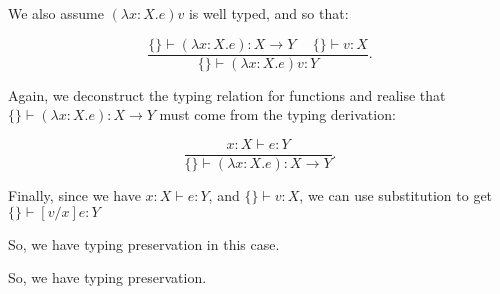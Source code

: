 \begin{enumerate}
\begin{itemize}
          We also assume $(\lambda x : X . e) v$ is well typed, and so that:

          \[
            \frac{\{\} \vdash (\lambda x : X . e) :X \rightarrow Y \hspace{15pt} \{\} \vdash v : X}{\{\} \vdash (\lambda x : X . e) v : Y}
          .\] 

          Again, we deconstruct the typing relation for functions and realise that $\{\} \vdash (\lambda x : X . e ) :X \rightarrow Y$ must come from the typing derivation:

          \[
            \frac{x : X \vdash e : Y}{\{\} \vdash (\lambda x : X . e) : X \rightarrow Y}
          .\] 

          Finally, since we have $x : X \vdash e : Y$, and $\{\} \vdash v : X$, we can use substitution to get $\{\} \vdash [v / x]e : Y$

          So, we have typing preservation in this case.
      \end{itemize}

      So, we have typing preservation.


  \end{enumerate}

